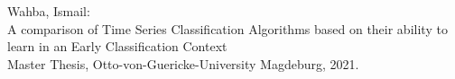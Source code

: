 \documentclass[11pt]{report}
\begin{document}

\small
\vspace*{\fill}
{\raggedright
Wahba, Ismail:\\
A comparison of Time Series Classification Algorithms based on their
ability to learn in an Early Classification Context \\ Master Thesis, Otto-von-Guericke-University Magdeburg, 2021. 
}

\thispagestyle{empty}
\null\newpage

\null\newpage

\null\newpage


\end{document}
